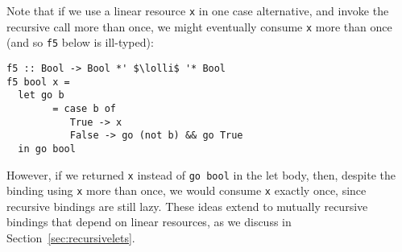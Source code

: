 \documentclass[acmsmall,review,anonymous,screen]{acmart}
\newcommand{\incode}[1]{\lstinline{#1}}
\newcommand{\parawith}[1]{\paragraph{\emph{#1}}}
\newcommand{\lolli}{\multimap}
\begin{document}
Note that if we use a linear resource \incode{x} in one case alternative, and invoke
the recursive call more than once, we might eventually consume \incode{x} more than
once (and so \incode{f5} below is ill-typed):
%
\begin{noway}
\begin{lstlisting}
f5 :: Bool -> Bool *' $\lolli$ '* Bool
f5 bool x =
  let go b
        = case b of
           True -> x
           False -> go (not b) && go True
  in go bool
\end{lstlisting}
\end{noway}
However, if we returned \incode{x} instead of \incode{go bool} in the let body, then, despite
the binding using \incode{x} more than once, we would consume \incode{x} exactly once,
since recursive bindings are still lazy.
%
These ideas extend to mutually recursive bindings that depend on
linear resources, as we discuss in Section~\ref{sec:recursivelets}.


\end{document}
